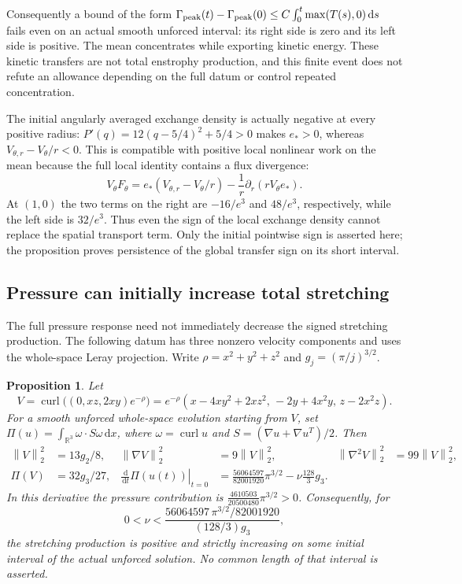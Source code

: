 \documentclass[11pt]{article}
\newtheorem{proposition}[theorem]{Proposition}
\theoremstyle{remark}
\newcommand{\R}{\mathbb R}
\newcommand{\dd}{\,\mathrm d}
\newcommand{\norm}[1]{\left\lVert#1\right\rVert}
\newcommand{\curl}{\operatorname{curl}}
\begin{document}
Consequently a bound of the form
$\Gamma_{\rm peak}(t)-\Gamma_{\rm peak}(0)
\leq C\int_0^t\max(T(s),0)\dd s$ fails even on an actual smooth
unforced interval: its right side is zero and its left side is
positive. The mean concentrates while exporting kinetic energy.
These kinetic transfers are not total enstrophy production, and this
finite event does not refute an allowance depending on the full datum
or control repeated concentration.

The initial angularly averaged exchange density is actually negative
at every positive radius: $P'(q)=12(q-5/4)^2+5/4>0$ makes
$e_*>0$, whereas $V_{\theta,r}-V_\theta/r<0$.
This is compatible with positive local nonlinear work on the mean because the
full local identity contains a flux divergence:
\[
 V_\theta F_\theta
 =e_*(V_{\theta,r}-V_\theta/r)
          -\frac1r\partial_r(rV_\theta e_*).
\]
At $(1,0)$ the two terms on the right are $-16/e^3$ and
$48/e^3$, respectively, while the left side is $32/e^3$.
Thus even the sign of the local exchange density cannot replace
the spatial transport term. Only the initial pointwise sign is
asserted here; the proposition proves persistence of the global
transfer sign on its short interval.

\subsection{Pressure can initially increase total stretching}

The full pressure response need not immediately decrease the signed
stretching production. The following datum has three nonzero velocity
components and uses the whole-space Leray projection.
Write $\rho=x^2+y^2+z^2$ and $g_j=(\pi/j)^{3/2}$.

\begin{proposition}\label{prop:triaxialFeedback}
Let
\[
 V=\curl\big((0,xz,2xy)e^{-\rho}\big)
   =e^{-\rho}(x-4xy^2+2xz^2,\,-2y+4x^2y,\,z-2x^2z).
\]
For a smooth unforced whole-space evolution starting from $V$, set
$\Pi(u)=\int_{\R^3}\omega\cdot S\omega\dd x$, where
$\omega=\curl u$ and $S=(\nabla u+\nabla u^T)/2$.
Then
\begin{align*}
 \norm V_2^2&=13g_2/8,&
 \norm{\nabla V}_2^2&=9\norm V_2^2,&
 \norm{\nabla^2V}_2^2&=99\norm V_2^2,\\
 \Pi(V)&=32g_3/27,&
 \left.\frac{\dd}{\dd t}\Pi(u(t))\right|_{t=0}
 &=\frac{56064597}{82001920}\pi^{3/2}
                -\nu\frac{128}{3}g_3.
\end{align*}
In this derivative the pressure contribution is
$\frac{4610503}{20500480}\pi^{3/2}>0$.
Consequently, for
\[
 0<\nu<\frac{56064597\,\pi^{3/2}/82001920}{(128/3)g_3},
\]
the stretching production is positive and strictly increasing on some
initial interval of the actual unforced solution.
No common length of that interval is asserted.
\end{proposition}
\end{document}
